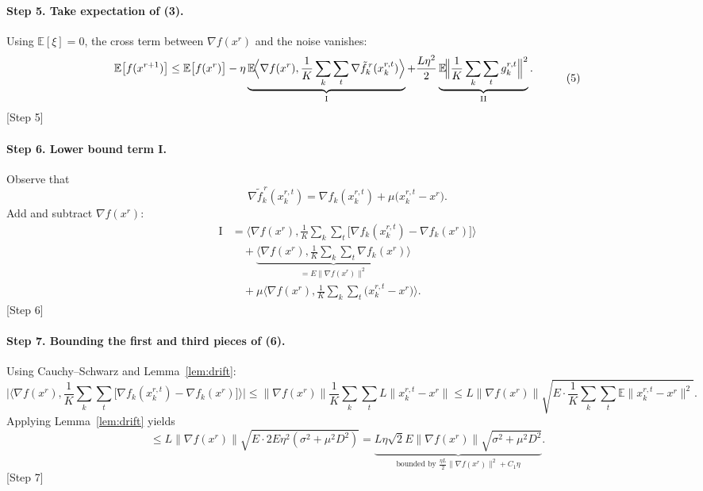 \documentclass{article}
\newcommand{\E}{\mathbb{E}}
\begin{document}
\paragraph{Step 5. Take expectation of (3).}
Using $\E[\xi]=0$, the cross term between $\nabla f(x^{r})$ and the noise vanishes:
\[
\begin{aligned}
    \E\bigl[f(x^{r+1})\bigr] &\le \E\bigl[f(x^{r})\bigr]
    -\eta\underbrace{\E\!\Bigl\langle\nabla f(x^{r}),\frac{1}{K}\sum_{k}\sum_{t}\nabla \tilde f_{k}^{\,r}(x_{k}^{r,t})\Bigr\rangle}_{\text{I}}
    +\frac{L\eta^{2}}{2}\underbrace{\E\!\Bigl\|\frac{1}{K}\sum_{k}\sum_{t}g_{k}^{r,t}\Bigr\|^{2}}_{\text{II}}.
\end{aligned}
\tag{5}
\]
[Step 5]

\paragraph{Step 6. Lower bound term I.}
Observe that
\[
\nabla \tilde f_{k}^{\,r}(x_{k}^{r,t}) = \nabla f_k(x_{k}^{r,t})+\mu\bigl(x_{k}^{r,t}-x^{r}\bigr).
\]
Add and subtract $\nabla f(x^{r})$:
\[
\begin{aligned}
\text{I}
&= \Big\langle\nabla f(x^{r}),\frac{1}{K}\sum_{k}\sum_{t}\bigl[\nabla f_k(x_{k}^{r,t})-\nabla f_k(x^{r})\bigr]\Big\rangle
\\
&\quad + \underbrace{\Big\langle\nabla f(x^{r}),\frac{1}{K}\sum_{k}\sum_{t}\nabla f_k(x^{r})\Big\rangle}_{=E\|\nabla f(x^{r})\|^{2}}
\\
&\quad +\mu\Big\langle\nabla f(x^{r}),\frac{1}{K}\sum_{k}\sum_{t}\bigl(x_{k}^{r,t}-x^{r}\bigr)\Big\rangle .
\end{aligned}
\tag{6}
\]
[Step 6]

\paragraph{Step 7. Bounding the first and third pieces of (6).}
Using Cauchy–Schwarz and Lemma~\ref{lem:drift}:
\[
\Big|\Big\langle\nabla f(x^{r}),\frac{1}{K}\sum_{k}\sum_{t}\bigl[\nabla f_k(x_{k}^{r,t})-\nabla f_k(x^{r})\bigr]\Big\rangle\Big|
\le \|\nabla f(x^{r})\|\frac{1}{K}\sum_{k}\sum_{t}L\|x_{k}^{r,t}-x^{r}\|
\le L\|\nabla f(x^{r})\|\sqrt{E\cdot\frac{1}{K}\sum_{k}\sum_{t}\E\|x_{k}^{r,t}-x^{r}\|^{2}}.
\]
Applying Lemma~\ref{lem:drift} yields
\[
\le L\|\nabla f(x^{r})\|\sqrt{E\cdot 2E\eta^{2}(\sigma^{2}+\mu^{2}D^{2})}
= \underbrace{L\eta\sqrt{2}E\|\nabla f(x^{r})\|\sqrt{\sigma^{2}+\mu^{2}D^{2}}}_{\text{bounded by } \frac{\eta L}{2}\|\nabla f(x^{r})\|^{2}+C_{1}\eta }.
\tag{7}
\]
[Step 7]
\end{document}
